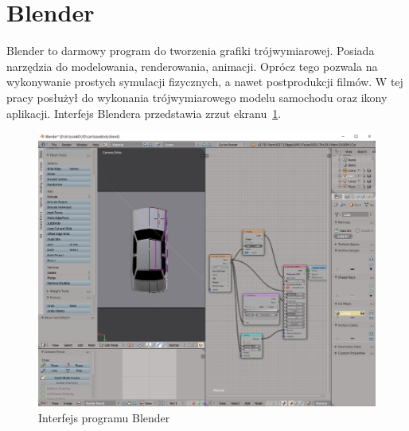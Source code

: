 \section*{Blender}
Blender to darmowy program do tworzenia grafiki trójwymiarowej. Posiada narzędzia do modelowania, renderowania, animacji. Oprócz tego pozwala na wykonywanie prostych symulacji fizycznych, a nawet postprodukcji filmów. W tej pracy posłużył do wykonania trójwymiarowego modelu samochodu oraz ikony aplikacji. Interfejs Blendera przedstawia zrzut ekranu~\ref{fig:blender}.
\begin{figure}[h!]
	\centering
	\includegraphics[width=1\linewidth]{blender}
	\caption[Interfejs programu Blender]{Interfejs programu Blender}
	\label{fig:blender}
\end{figure}

